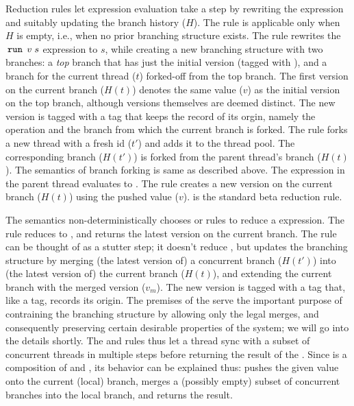 Reduction rules let expression evaluation take a step by rewriting the
expression and suitably updating the branch history ($H$). The
 rule is applicable only when $H$ is empty, i.e.,
when no prior branching structure exists. The rule rewrites the
$\,{\tt run}\,\;v\;s$ expression to $s$, while creating a new branching
structure with two branches: a \emph{top} branch that has just the
initial version (tagged with ), and a branch for the current
thread ($t$) forked-off from the top branch.  The first version on the
current branch ($H(t)$) denotes the same value ($v$) as the initial
version on the top branch, although versions themselves are deemed
distinct. The new version is tagged with a  tag that keeps the
record of its orgin, namely the  operation and the branch from
which the current branch is forked. The  rule forks
a new thread with a fresh id ($t'$) and adds it to the thread pool.
The corresponding branch ($H(t')$) is forked from the parent thread's
branch ($H(t)$). The semantics of branch forking is same as described
above. The  expression in the parent thread evaluates to
\C{()}. The  rule creates a new version on the
current branch ($H(t)$) using the pushed value ($v$).
 is the standard beta reduction rule.

The semantics non-deterministically chooses  or
 rules to reduce a  expression. The
 rule reduces  to \C{()}, and returns the
latest version on the current branch. The  rule
can be thought of as a stutter step; it doesn't reduce , but
updates the branching structure by merging (the latest version of) a
concurrent branch ($H(t')$) into (the latest version of) the current
branch ($H(t)$), and extending the current branch with the merged
version ($v_m$). The new version is tagged with a  tag that,
like a  tag, records its origin. The premises of the
 serve the important purpose of contraining the
branching structure by allowing only the legal merges, and
consequently preserving certain desirable properties of the system;
we will go into the details shortly. The  and
 rules thus let a thread sync with a subset of
concurrent threads in multiple steps before returning the result of
the . Since  is a composition of  and
, its behavior can be explained thus:  pushes the
given value onto the current (local) branch, merges a (possibly empty)
subset of concurrent branches into the local branch, and returns the
result.

